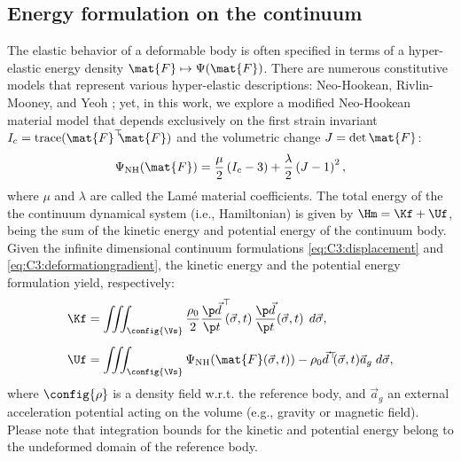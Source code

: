 \subsection{Energy formulation on the continuum}
The elastic behavior of a deformable body is often specified in terms of a hyper-elastic energy density $\mat{F} \mapsto \Psi(\mat{F})$. There are numerous constitutive models that represent various hyper-elastic descriptions: Neo-Hookean, Rivlin-Mooney, and Yeoh \cite{Kim2018,Goury2018,Duriez2013}; yet, in this work, we explore a modified Neo-Hookean material model \cite{Smith2018,Kim2018} that depends exclusively on the first strain invariant $I_c = \text{trace}(\mat{F}^\top\!\! \mat{F})$ and the volumetric change $J = \det{\mat{F}}$:
%
\begin{equation}
\Psi_\text{NH}(\mat{F}) = \frac{\mu}{2} \left({I}_c - 3 \right) + \frac{\lambda}{2} \left({J} - 1 \right)^2,
\label{eq:C3:neohookean}
\end{equation}
%
where $\mu$ and $\lambda$ are called the Lam\'{e} material coefficients. The total energy of the the continuum dynamical system (i.e., Hamiltonian) is given by $\Hm = \Kf + \Uf$, being the sum of the kinetic energy and potential energy of the continuum body. Given the infinite dimensional continuum formulations \eqref{eq:C3:displacement} and \eqref{eq:C3:deformationgradient}, the kinetic energy and the potential energy formulation yield, respectively:
%
\begin{align}
\Kf & = \iiint_{\config{\Vs}}  \frac{\rho_0}{2} {\frac{\p \vec{d}}{\p t}}^\top\!\!\! (\vec{\sigma},t)  \, \frac{\p \vec{d}}{\p t}(\vec{\sigma},t)\, \; d\vec{\sigma},
\label{eq:C3:kinetic}
\\[0.5em]
\Uf & = \iiint_{\config{\Vs}} \Psi_{\text{NH}}(\mat{F}(\vec{\sigma},t)) - \rho_0 \vec{d}^\top\!\!(\vec{\sigma},t) \vec{a}_g  \; d\vec{\sigma},
\label{eq:C3:potential}
\end{align}
%
where $\config{\rho}$ is a density field w.r.t. the reference body, and $\vec{a}_g$ an external acceleration potential acting on the volume (e.g., gravity or magnetic field). Please note that integration bounds for the kinetic and potential energy belong to the undeformed domain of the reference body.

